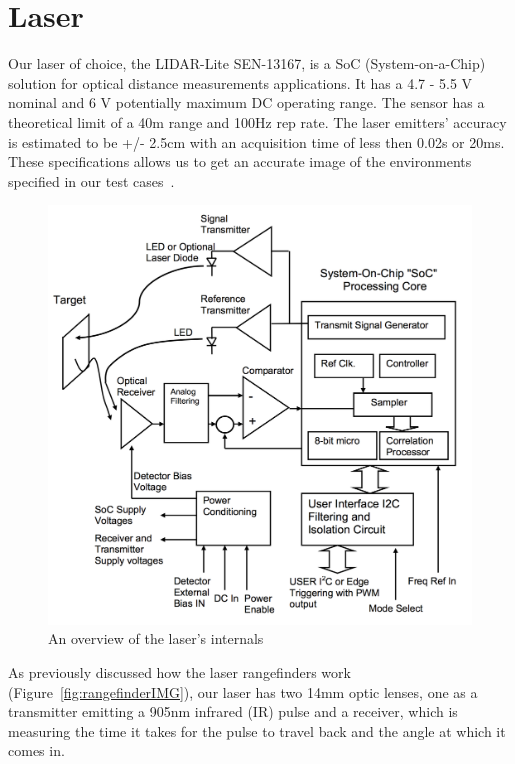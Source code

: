 \clearpage
\section{Laser}

Our laser of choice, the LIDAR-Lite SEN-13167, is a SoC (System-on-a-Chip) solution for optical distance measurements applications. It has a 4.7 - 5.5 V nominal and 6 V potentially maximum DC operating range. The sensor has a theoretical limit of a 40m range and 100Hz rep rate. The laser emitters' accuracy is estimated to be +/- 2.5cm with an acquisition time of less then 0.02s or 20ms. These specifications allows us to get an accurate image of the environments specified in our test cases~\cite{lidarsum}.

\begin{figure}[H]
	\centering
	\includegraphics[scale=.4]{images/internallidar.png}
	\caption{An overview of the laser's internals}
	\label{fig:internallidar}
\end{figure}

As previously discussed how the laser rangefinders work (Figure~\ref{fig:rangefinderIMG}), our laser has two 14mm optic lenses, one as a transmitter emitting a 905nm infrared (IR) pulse and a receiver, which is measuring the time it takes for the pulse to travel back and the angle at which it comes in.

